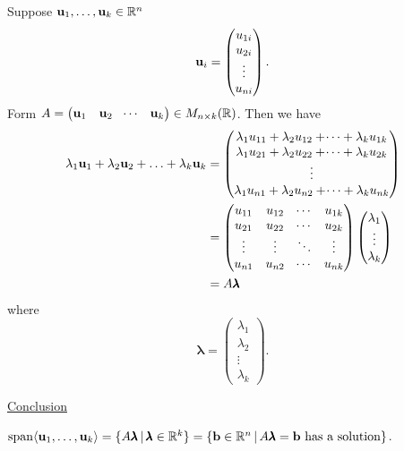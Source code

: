 \documentclass[10pt, a4paper]{article}
\begin{document}
Suppose $\mathbf{u}_1, \dotsc, \mathbf{u}_k \in \mathbb{R} ^ n$
\[
\mathbf{u}_i = \begin{pmatrix}
    u_{1i} \\ u_{2i} \\ \vdots \\ u_{ni}
\end{pmatrix}.
\]
Form $A = \begin{pmatrix}
    \mathbf{u}_1  & \mathbf{u}_2 & \dotsi & \mathbf{u}_k
\end{pmatrix} \in M_{n \times k}(\mathbb{R})$.
Then we have
\begin{align*}
\lambda_1\mathbf{u}_1 + \lambda_2\mathbf{u}_2 + \dotsc + \lambda_k\mathbf{u}_k
&= \begin{pmatrix}
    \lambda_1u_{11} + \lambda_2u_{12} + \dotsi + \lambda_ku_{1k} \\
    \lambda_1u_{21} + \lambda_2u_{22} + \dotsi + \lambda_ku_{2k} \\
    \vdots \\
    \lambda_1u_{n1} + \lambda_2u_{n2} + \dotsi + \lambda_ku_{nk}
\end{pmatrix} \\
&= \begin{pmatrix}
    u_{11} & u_{12} & \dotsi & u_{1k} \\
    u_{21} & u_{22} & \dotsi & u_{2k} \\
    \vdots & \vdots & \ddots & \vdots \\
    u_{n1} & u_{n2} & \dotsi & u_{nk}
\end{pmatrix}
\begin{pmatrix}
    \lambda_1 \\ \vdots \\ \lambda_k
\end{pmatrix} \\
&=
A\pmb{\lambda}
\end{align*}
where
\[
\pmb{\lambda} = \begin{pmatrix}
    \lambda_1 \\ \lambda_2 \\ \vdots \\ \lambda_k
\end{pmatrix}.
\]

\underline{Conclusion}

$\mathrm{span}\langle\mathbf{u}_1, \dotsc, \mathbf{u}_k\rangle = \{A\pmb{\lambda}\,|\,\pmb{\lambda} \in \mathbb{R} ^ k\} = \{\mathbf{b} \in \mathbb{R} ^ n\,|\, A\pmb{\lambda} = \mathbf{b}\text{ has a solution}\}$.
\end{document}
